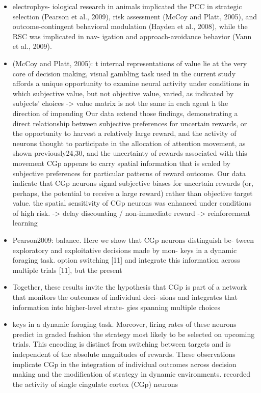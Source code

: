 \documentclass{article} %
\begin{document}
\begin{itemize}
\begin{itemize}
\item
electrophys- iological research in animals implicated the PCC in strategic selection (Pearson et al., 2009), risk assessment (McCoy and Platt, 2005), and outcome-contingent behavioral modulation (Hayden et al., 2008), while the RSC was implicated in nav- igation and approach-avoidance behavior (Vann et al., 2009).

\item
(McCoy and Platt, 2005):
t internal representations of value lie at the very core of
decision making,
visual gambling task used in the current study affords a unique
opportunity to examine neural activity under conditions in which
subjective value, but not objective value, varied, as indicated by
subjects’ choices
-> value matrix is not the same in each agent
h the direction of impending
Our data extend those
findings, demonstrating a direct relationship between subjective preferences
for uncertain rewards, or the opportunity to harvest a
relatively large reward, and the activity of neurons thought to participate
in the allocation of attention
movement, as shown previously24,30, and the uncertainty of rewards
associated with this movement
CGp appears to carry spatial information that is scaled by
subjective preferences for particular patterns of reward outcome.
Our data indicate that CGp
neurons signal subjective biases for uncertain rewards (or, perhaps, the
potential to receive a large reward) rather than objective target value.
the spatial sensitivity of CGp neurons was enhanced under
conditions of high risk.
-> delay discounting / non-immediate reward -> reinforcement learning

\item
Pearson2009:
balance. Here we show that CGp neurons distinguish be- tween exploratory and exploitative decisions made by mon- keys in a dynamic foraging task.
 option switching [11] and integrate this information across multiple trials [11], but the present

 \item
 Together, these results invite the hypothesis that CGp is part of a network that monitors the outcomes of individual deci- sions and integrates that information into higher-level strate- gies spanning multiple choices

 \item
keys in a dynamic foraging task. Moreover, firing rates of these neurons predict in graded fashion the strategy most likely to be selected on upcoming trials. This encoding is distinct from switching between targets and is independent of the absolute magnitudes of rewards. These observations implicate CGp in the integration of individual outcomes across decision making and the modification of strategy in dynamic environments.
recorded the activity of single cingulate cortex (CGp) neurons


\end{itemize}
\end{itemize}
\end{document}
